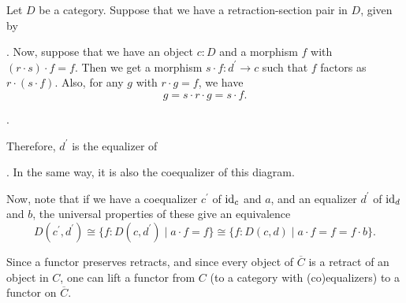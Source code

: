 \begin{remark}
  Let $ D $ be a category. Suppose that we have a retraction-section pair in $ D $, given by
  .
  Now, suppose that we have an object $ c: D $ and a morphism $ f $ with $ (r \cdot s) \cdot f = f $. Then we get a morphism $ s \cdot f: d^\prime \to c $ such that $ f $ factors as $ r \cdot (s \cdot f) $. Also, for any $ g $ with $ r \cdot g = f $, we have
  \[ g = s \cdot r \cdot g = s \cdot f. \]
  \begin{center}
    .
  \end{center}
  Therefore, $ d^\prime $ is the equalizer of . In the same way, it is also the coequalizer of this diagram.

  Now, note that if we have a coequalizer $ c^\prime $ of $ \text{id}_{c} $ and $ a $, and an equalizer $ d^\prime $ of $ \text{id}_{d} $ and $ b $, the universal properties of these give an equivalence
  \[ D(c^\prime, d^\prime) \cong \{ f: D(c, d^\prime) \mid a \cdot f = f \} \cong \{ f: D(c, d) \mid a \cdot f = f = f \cdot b \}. \]
  \begin{center}
  \end{center}
\end{remark}

Since a functor preserves retracts, and since every object of $ \overline C $ is a retract of an object in $ C $, one can lift a functor from $ C $ (to a category with (co)equalizers) to a functor on $ \overline C $.


